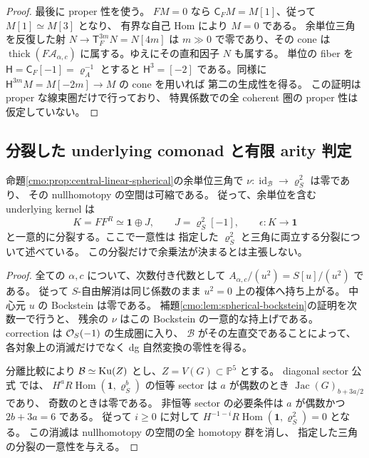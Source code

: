 \begin{proof}
最後に proper 性を使う。
$FM=0$ なら $\mathsf C_FM=M[1]$、従って $M[1]\simeq M[3]$ となり、
有界な自己 Hom により $M=0$ である。
余単位三角を反復した射 $N\to\mathsf T_F^{3m}N=N[4m]$ は
$m\gg0$ で零であり、その cone は $\operatorname{thick}(F\mathcal A_{\alpha,c})$
に属する。ゆえにその直和因子 $N$ も属する。
単位の fiber を $\mathsf H=\mathsf C_F[-1]=\varrho_A^{-1}$ とすると
$\mathsf H^3=[-2]$ である。同様に
$\mathsf H^{3m}M=M[-2m]\to M$ の cone を用いれば
第二の生成性を得る。
この証明は proper な線束圏だけで行っており、
特異係数での全 coherent 圏の proper 性は仮定していない。
\end{proof}

\subsection{分裂した underlying comonad と有限 arity 判定}

\begin{lemma}
\label{cmo:lem:central-linear-split-comonad}
命題\ref{cmo:prop:central-linear-spherical}の余単位三角で
$\nu:\operatorname{id}_{\mathcal B}\to\varrho_S^2$ は零であり、
その nullhomotopy の空間は可縮である。
従って、余単位を含む underlying kernel は
\begin{equation}\label{cmo:eq:central-linear-split-comonad}
 K=FF^R\simeq\mathbf1\oplus J,\qquad
 J=\varrho_S^2[-1],\qquad
 \epsilon:K\longrightarrow\mathbf1
\end{equation}
と一意的に分裂する。ここで一意性は
指定した $\varrho_S^2$ と三角に両立する分裂について述べている。
この分裂だけで余乗法が決まるとは主張しない。
\end{lemma}

\begin{proof}
全ての $\alpha,c$ について、次数付き代数として
$A_{\alpha,c}/(u^2)=S[u]/(u^2)$ である。
従って $S$-自由解消は同じ係数のまま $u^2=0$ 上の複体へ持ち上がる。
中心元 $u$ の Bockstein は零である。
補題\ref{cmo:lem:spherical-bockstein}の証明を次数一で行うと、
残余の $\nu$ はこの Bockstein の一意的な持上げである。
correction は $\mathcal O_S(-1)$ の生成圏に入り、
$\mathcal B$ がその左直交であることによって、
各対象上の消滅だけでなく dg 自然変換の零性を得る。

分離比較により $\mathcal B\simeq\operatorname{Ku}(Z)$ とし、$Z=V(G)\subset\mathbb P^5$ とする。
diagonal sector 公式
\cite[Theorem~5.39]{NFBFKKernels}では、
$H^aR\operatorname{Hom}(\mathbf1,\varrho_S^b)$ の恒等 sector は
$a$ が偶数のとき $\operatorname{Jac}(G)_{b+3a/2}$ であり、
奇数のときは零である。
非恒等 sector の必要条件は $a$ が偶数かつ $2b+3a=6$ である。
従って $i\ge0$ に対して
$H^{-1-i}R\operatorname{Hom}(\mathbf1,\varrho_S^2)=0$ となる。
この消滅は nullhomotopy の空間の全 homotopy 群を消し、
指定した三角の分裂の一意性を与える。
\end{proof}

